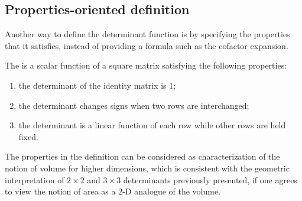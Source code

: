 \documentclass{ximera}
\begin{document}








\subsection{Properties-oriented definition}

Another way to define the determinant function is by specifying the
properties that it satisfies, instead of providing a formula such as
the cofactor expansion.

\begin{definition}
  The  is a scalar function of a square matrix
  satisfying the following properties:
  \begin{enumerate}
  \item the determinant of the identity matrix is 1;
  \item the determinant changes signs when two rows are interchanged;
  \item the determinant is a linear function of each row while other
    rows are held fixed.
  \end{enumerate}
\end{definition}

The properties in the definition can be considered as characterization
of the notion of volume for higher dimensions, which is consistent
with the geometric interpretation of $2 \times 2$ and $3 \times 3$ determinants
previously presented, if one agrees to view the notion of area as a
2-D analogue of the volume.
\end{document}
